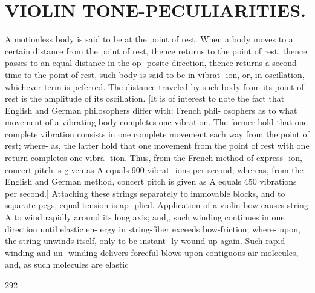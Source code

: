 \documentclass{article}
\begin{document}
\section*{VIOLIN TONE-PECULIARITIES.}
A motionless body is said to be at the point of rest. When a body moves to a certain distance from the point of rest, thence returns to the point of rest, thence passes to an equal distance in the op- posite direction, thence returns a second time to the point of rest, such body is said to be in vibrat- ion, or, in oscillation, whichever term is peferred. The distance traveled by such body from its point of rest is the amplitude of its oscillation. [It is of interest to note the fact that English and German philosophers differ with: French phil- osophers as to what movement of a vibrating body completes one vibration. The former hold that one complete vibration consists in one complete movement each way from the point of rest; where- as, the latter hold that one movement from the point of rest with one return completes one vibra- tion. Thus, from the French method of express- ion, concert pitch is given as A equals 900 vibrat- ions per second; whereas, from the English and German method, concert pitch is given as A equals 450 vibrations per second.] Attaching these strings separately to immovable blocks, and to separate pegs, equal tension is ap- plied. Application of a violin bow causes string A to wind rapidly around its long axis; and,, such winding continues in one direction until elastic en- ergy in string-fiber exceeds bow-friction; where- upon, the string unwinds itself, only to be instant- ly wound up again. Such rapid winding and un- winding delivers forceful blows upon contiguous air molecules, and, as such molecules are elastic

292
\end{document}
